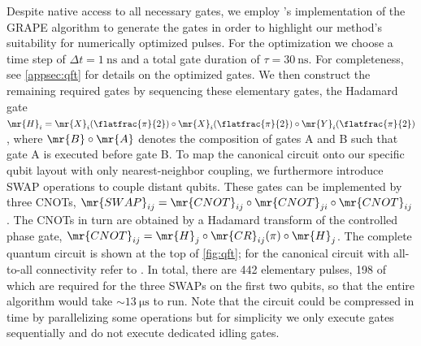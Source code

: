 Despite native access to all necessary gates, we employ \qutip's implementation \cite{Johansson2013} of the GRAPE algorithm \cite{Khaneja2005,Schulte-Herbruggen2005} to generate the gates in order to highlight our method's suitability for numerically optimized pulses. For the optimization we choose a time step of $\Delta t = \SI{1}{\nano\second}$ and a total gate duration of $\tau = \SI{30}{\nano\second}$. For completeness, see \cref{appsec:qft} for details on the optimized gates. We then construct the remaining required gates by sequencing these elementary gates, \ie the Hadamard gate $\mr{H}_i = \mr{X}_{i}(\flatfrac{\pi}{2})\circ\mr{X}_{i}(\flatfrac{\pi}{2})\circ\mr{Y}_{i}(\flatfrac{\pi}{2})$, where $\mr{B}\circ\mr{A}$ denotes the composition of gates A and B such that gate A is executed before gate B. To map the canonical circuit \cite{NielsenChuang2011} onto our specific qubit layout with only nearest-neighbor coupling, we furthermore introduce SWAP operations to couple distant qubits. These gates can be implemented by three CNOTs, $\mr{SWAP}_{ij} = \mr{CNOT}_{ij}\circ\mr{CNOT}_{ji}\circ\mr{CNOT}_{ij}$. The CNOTs in turn are obtained by a Hadamard transform of the controlled phase gate, $\mr{CNOT}_{ij} = \mr{H}_j\circ\mr{CR}_{ij}(\pi)\circ\mr{H}_j$. The complete quantum circuit is shown at the top of \cref{fig:qft}; for the canonical circuit with all-to-all connectivity refer to . In total, there are \num{442} elementary pulses, \num{198} of which are required for the three SWAPs on the first two qubits, so that the entire algorithm would take $\sim\SI{13}{\micro\second}$ to run. Note that the circuit could be compressed in time by parallelizing some operations but for simplicity we only execute gates sequentially and do not execute dedicated idling gates.

